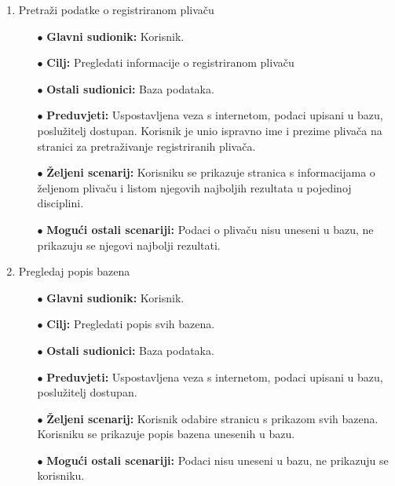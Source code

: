 \documentclass[times, utf8, zavrsni]{fer}
\begin{document}
\begin{enumerate}
    \item Pretraži podatke o registriranom plivaču
    \begin{itemize}
        \item[$\bullet$] \textbf{Glavni sudionik:} Korisnik.
        \item[$\bullet$] \textbf{Cilj:} Pregledati informacije o registriranom plivaču
        \item[$\bullet$] \textbf{Ostali sudionici:} Baza podataka.
        \item[$\bullet$] \textbf{Preduvjeti:} Uspostavljena veza s internetom, podaci upisani u bazu, poslužitelj dostupan. 
        Korisnik je unio ispravno ime i prezime plivača na stranici za pretraživanje registriranih plivača.
        \item[$\bullet$] \textbf{Željeni scenarij:} Korisniku se prikazuje stranica
        s informacijama o željenom plivaču i listom njegovih najboljih rezultata u pojedinoj disciplini.
        \item[$\bullet$] \textbf{Mogući ostali scenariji:} Podaci o plivaču nisu uneseni u bazu, ne prikazuju se njegovi najbolji rezultati.
    \end{itemize}

    \item Pregledaj popis bazena
    \begin{itemize}
        \item[$\bullet$] \textbf{Glavni sudionik:} Korisnik.
        \item[$\bullet$] \textbf{Cilj:} Pregledati popis svih bazena. 
        \item[$\bullet$] \textbf{Ostali sudionici:} Baza podataka.
        \item[$\bullet$] \textbf{Preduvjeti:} Uspostavljena veza s internetom, podaci upisani u bazu, poslužitelj dostupan.
        \item[$\bullet$] \textbf{Željeni scenarij:} Korisnik odabire stranicu s prikazom svih bazena. Korisniku se prikazuje popis bazena
        unesenih u bazu.
        \item[$\bullet$] \textbf{Mogući ostali scenariji:} Podaci nisu uneseni u bazu, ne prikazuju se korisniku.
    \end{itemize}
    

\end{enumerate}
\end{document}
